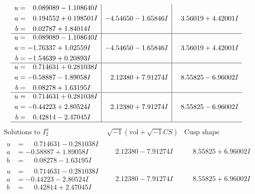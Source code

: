 \documentclass[1p]{elsarticle_modified}
\theoremstyle{definition}
\newcommand{\I}{\sqrt{-1}}
\begin{document}
$$\begin{array}{c|c|c}
\begin{aligned}
u &= \phantom{-}0.089089 - 1.108640 I \\
a &= \phantom{-}0.194552 + 0.198501 I \\
b &= \phantom{-}0.02787 + 1.84014 I\end{aligned}
 & -4.54650 - 1.65846 I & \phantom{-}3.56019 + 4.42001 I \\ \hline\begin{aligned}
u &= \phantom{-}0.089089 - 1.108640 I \\
a &= -1.76337 + 1.02559 I \\
b &= -1.54639 + 0.20893 I\end{aligned}
 & -4.54650 - 1.65846 I & \phantom{-}3.56019 + 4.42001 I \\ \hline\begin{aligned}
u &= \phantom{-}0.714631 + 0.281038 I \\
a &= -0.58887 - 1.89058 I \\
b &= \phantom{-}0.08278 + 1.63195 I\end{aligned}
 & \phantom{-}2.12380 + 7.91274 I & \phantom{-}8.55825 - 6.96002 I \\ \hline\begin{aligned}
u &= \phantom{-}0.714631 + 0.281038 I \\
a &= -0.44223 + 2.80524 I \\
b &= \phantom{-}0.42814 - 2.47045 I\end{aligned}
 & \phantom{-}2.12380 + 7.91274 I & \phantom{-}8.55825 - 6.96002 I\\
 \hline 
 \end{array}$$\newpage$$\begin{array}{c|c|c}  
\text{Solutions to }I^u_{2}& \I (\text{vol} + \sqrt{-1}CS) & \text{Cusp shape}\\
 \hline 
\begin{aligned}
u &= \phantom{-}0.714631 - 0.281038 I \\
a &= -0.58887 + 1.89058 I \\
b &= \phantom{-}0.08278 - 1.63195 I\end{aligned}
 & \phantom{-}2.12380 - 7.91274 I & \phantom{-}8.55825 + 6.96002 I \\ \hline\begin{aligned}
u &= \phantom{-}0.714631 - 0.281038 I \\
a &= -0.44223 - 2.80524 I \\
b &= \phantom{-}0.42814 + 2.47045 I\end{aligned}
 & \phantom{-}2.12380 - 7.91274 I & \phantom{-}8.55825 + 6.96002 I \\ \hline\begin{aligned}

\end{aligned}
\end{array}$$
\end{document}
